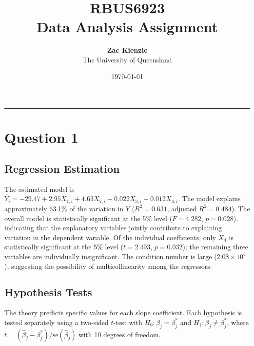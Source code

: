 \documentclass[11pt, a4paper]{article}
\title{\vspace{-2cm}\textbf{\color{uqpurple}RBUS6923}\\ \Large Data Analysis Assignment}
\author{\textbf{Zac Kienzle} \\ The University of Queensland}
\date{\today}
\begin{document}
\maketitle
\vspace{-1cm}
\rule{\textwidth}{0.4pt}

\tableofcontents

\clearpage

\section{Question 1}

\subsection{Regression Estimation}

\begin{table}[H]
	\centering
	
	\caption{OLS regression results for equation~(Q1a).}\label{tab:q1a}
\end{table}

The estimated model is \(\hat{Y}_i = -29.47 + 2.95X_{1,i} + 4.63X_{2,i} + 0.022X_{3,i} + 0.012X_{4,i}\). The model explains approximately 63.1\% of the variation in \(Y\) (\(R^2 = 0.631\), adjusted \(R^2 = 0.484\)). The overall model is statistically significant at the 5\% level (\(F = 4.282\), \(p = 0.028\)), indicating that the explanatory variables jointly contribute to explaining variation in the dependent variable. Of the individual coefficients, only \(X_4\) is statistically significant at the 5\% level (\(t = 2.493\), \(p = 0.032\)); the remaining three variables are individually insignificant. The condition number is large (\(2.08 \times 10^4\)), suggesting the possibility of multicollinearity among the regressors.

\subsection{Hypothesis Tests}

The theory predicts specific values for each slope coefficient. Each hypothesis is tested separately using a two-sided \(t\)-test with \(H_0\colon \beta_j = \beta_j^*\) and \(H_1\colon \beta_j \neq \beta_j^*\), where \(t = (\hat{\beta}_j - \beta_j^*) / \mathrm{se}(\hat{\beta}_j)\) with 10 degrees of freedom.

\begin{table}[H]
	\centering
	
	\caption{Hypothesis test: \(H_0\colon \beta_1 = 2.00\).}\label{tab:q1b_x1}
\end{table}
\end{document}
